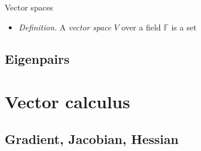 \documentclass{beamer}
\numberwithin{equation}{section}
\begin{document}
\begin{frame}{Vector spaces}
    \begin{itemize}
        \item
        \textit{Definition.} A \textit{vector space} $ V $ over a field
        $ \mathbb{F} $ is a set 
    \end{itemize}
\end{frame}


\subsection{Eigenpairs}

\section{Vector calculus}

\subsection{Gradient, Jacobian, Hessian}
\end{document}
